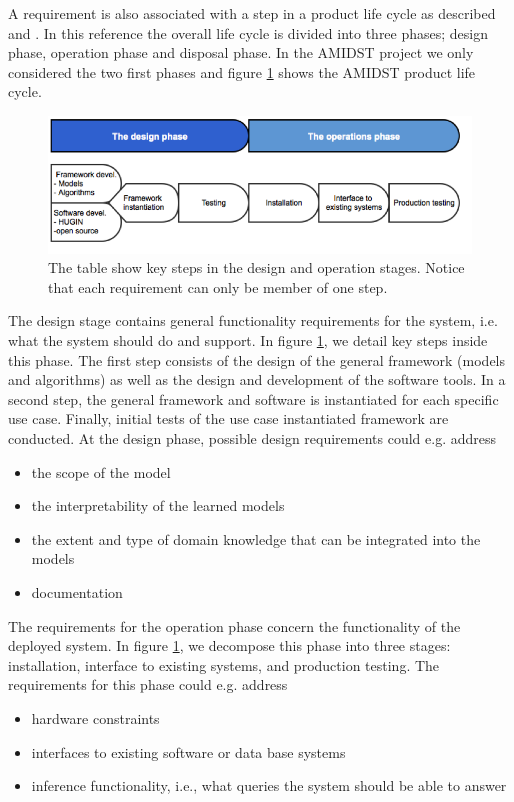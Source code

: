 \documentclass[11pt, oneside]{article}   	%
\begin{document}
A requirement is also associated with a step in a product life cycle as described and \cite{Eig09}.  In this reference the overall life cycle is divided into three phases; design phase, operation phase and disposal phase.  In the AMIDST project we only considered the two first phases and figure \ref{REprocess2} shows the AMIDST product life cycle.

\begin{figure}
\centering
\includegraphics [keepaspectratio,width = 14cm] {REprocess2}
\caption{The table show key steps in the design and operation stages. Notice that each requirement can only be member of one step.}
\label{REprocess2}
\end{figure}

The design stage contains general functionality requirements for the system, i.e. what the system should do and support.  In figure \ref{REprocess2}, we detail key steps inside this phase. The first step consists of the design of the general framework (models and algorithms) as well as the design and development of the software tools. In a second step, the general framework and software is instantiated for each specific use case. Finally, initial tests of the use case instantiated framework are conducted.  At the design phase, possible design requirements could e.g. address
\begin{itemize}
 \item the scope of the model
 \item the interpretability of the learned models
 \item the extent and type of domain knowledge that can be integrated into the models
 \item documentation
\end{itemize}

The requirements for the operation phase concern the functionality of the deployed system. In figure \ref{REprocess2}, we decompose this phase into three stages: installation, interface to existing systems, and production testing. The requirements for this phase could e.g. address
\begin{itemize}
 \item hardware constraints
 \item interfaces to existing software or data base systems
 \item inference functionality, i.e., what queries the system should be able to answer
\end{itemize}
\end{document}
